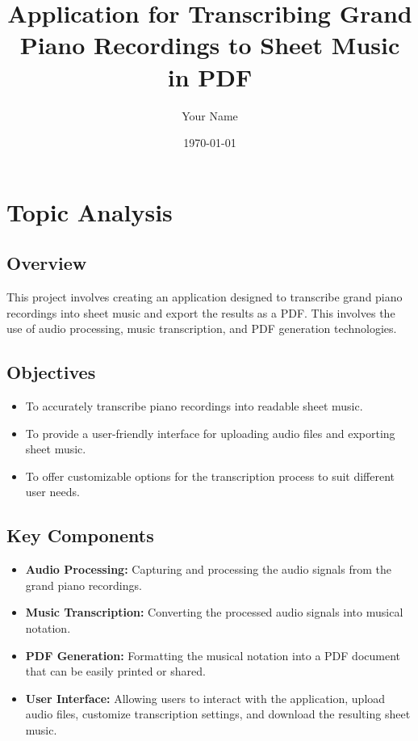 \documentclass{article}
\title{Application for Transcribing Grand Piano Recordings to Sheet Music in PDF}
\author{Your Name}
\date{\today}
\begin{document}
\maketitle

\tableofcontents

\section{Topic Analysis}

\subsection{Overview}
This project involves creating an application designed to transcribe grand piano recordings into sheet music and export the results as a PDF. This involves the use of audio processing, music transcription, and PDF generation technologies.

\subsection{Objectives}
\begin{itemize}
    \item To accurately transcribe piano recordings into readable sheet music.
    \item To provide a user-friendly interface for uploading audio files and exporting sheet music.
    \item To offer customizable options for the transcription process to suit different user needs.
\end{itemize}

\subsection{Key Components}
\begin{itemize}
    \item \textbf{Audio Processing:} Capturing and processing the audio signals from the grand piano recordings.
    \item \textbf{Music Transcription:} Converting the processed audio signals into musical notation.
    \item \textbf{PDF Generation:} Formatting the musical notation into a PDF document that can be easily printed or shared.
    \item \textbf{User Interface:} Allowing users to interact with the application, upload audio files, customize transcription settings, and download the resulting sheet music.
\end{itemize}
\end{document}
